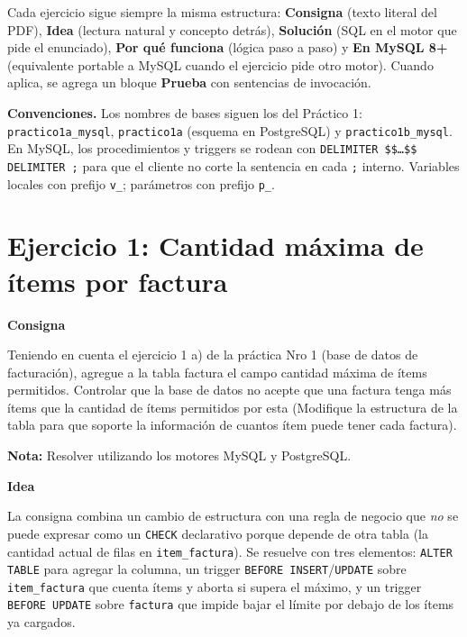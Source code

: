 \documentclass[11pt,a4paper]{article}
\newcommand{\itemcabecera}[1]{\noindent\textbf{#1}\par\medskip}
\newcommand{\bloqueConsigna}{\itemcabecera{Consigna}}
\newcommand{\bloqueIdea}{\itemcabecera{Idea}}
\begin{document}
Cada ejercicio sigue siempre la misma estructura: \textbf{Consigna} (texto literal del PDF), \textbf{Idea} (lectura natural y concepto detrás), \textbf{Solución} (SQL en el motor que pide el enunciado), \textbf{Por qué funciona} (lógica paso a paso) y \textbf{En MySQL 8+} (equivalente portable a MySQL cuando el ejercicio pide otro motor). Cuando aplica, se agrega un bloque \textbf{Prueba} con sentencias de invocación.

\begin{nota}
\textbf{Convenciones.} Los nombres de bases siguen los del Práctico 1: \texttt{practico1a\_mysql}, \texttt{practico1a} (esquema en PostgreSQL) y \texttt{practico1b\_mysql}. En MySQL, los procedimientos y triggers se rodean con \texttt{DELIMITER \$\$\dots\$\$ DELIMITER ;} para que el cliente no corte la sentencia en cada \texttt{;} interno. Variables locales con prefijo \texttt{v\_}; parámetros con prefijo \texttt{p\_}.
\end{nota}

\section{Ejercicio 1: Cantidad máxima de ítems por factura}

\bloqueConsigna

Teniendo en cuenta el ejercicio 1 a) de la práctica Nro 1 (base de datos de facturación), agregue a la tabla factura el campo cantidad máxima de ítems permitidos. Controlar que la base de datos no acepte que una factura tenga más ítems que la cantidad de ítems permitidos por esta (Modifique la estructura de la tabla para que soporte la información de cuantos ítem puede tener cada factura).

\textbf{Nota:} Resolver utilizando los motores MySQL y PostgreSQL.

\bloqueIdea

La consigna combina un cambio de estructura con una regla de negocio que \emph{no} se puede expresar como un \texttt{CHECK} declarativo porque depende de otra tabla (la cantidad actual de filas en \texttt{item\_factura}). Se resuelve con tres elementos: \texttt{ALTER TABLE} para agregar la columna, un trigger \texttt{BEFORE INSERT}/\texttt{UPDATE} sobre \texttt{item\_factura} que cuenta ítems y aborta si supera el máximo, y un trigger \texttt{BEFORE UPDATE} sobre \texttt{factura} que impide bajar el límite por debajo de los ítems ya cargados.
\end{document}
